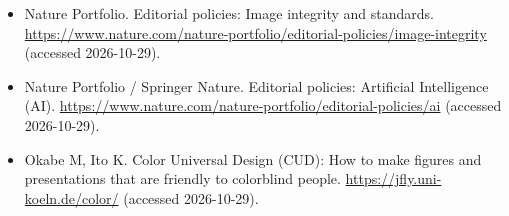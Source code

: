\begin{itemize}
\item Nature Portfolio. Editorial policies: Image integrity and standards. \url{https://www.nature.com/nature-portfolio/editorial-policies/image-integrity} (accessed 2026-10-29).
\item Nature Portfolio / Springer Nature. Editorial policies: Artificial Intelligence (AI). \url{https://www.nature.com/nature-portfolio/editorial-policies/ai} (accessed 2026-10-29).
\item Okabe M, Ito K. Color Universal Design (CUD): How to make figures and presentations that are friendly to colorblind people. \url{https://jfly.uni-koeln.de/color/} (accessed 2026-10-29).
\end{itemize}
